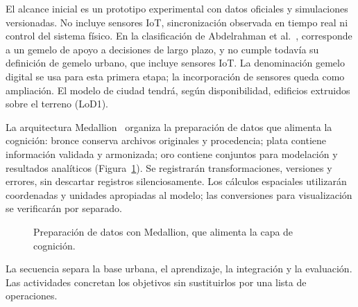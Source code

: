 \documentclass[journal]{IEEEtran}
\begin{document}
El alcance inicial es un prototipo experimental con datos oficiales y simulaciones versionadas. No incluye sensores IoT, sincronización observada en tiempo real ni control del sistema físico. En la clasificación de Abdelrahman et al.~\cite{abdelrahman2025}, corresponde a un gemelo de apoyo a decisiones de largo plazo, y no cumple todavía su definición de gemelo urbano, que incluye sensores IoT. La denominación gemelo digital se usa para esta primera etapa; la incorporación de sensores queda como ampliación. El modelo de ciudad tendrá, según disponibilidad, edificios extruidos sobre el terreno (LoD1).

La arquitectura Medallion~\cite{strengholt2025} organiza la preparación de datos que alimenta la cognición: bronce conserva archivos originales y procedencia; plata contiene información validada y armonizada; oro contiene conjuntos para modelación y resultados analíticos (Figura~\ref{fig:medallion}). Se registrarán transformaciones, versiones y errores, sin descartar registros silenciosamente. Los cálculos espaciales utilizarán coordenadas y unidades apropiadas al modelo; las conversiones para visualización se verificarán por separado.

\begin{figure}[!t]
\centering
{}
\caption{Preparación de datos con Medallion, que alimenta la capa de cognición.}
\label{fig:medallion}
\end{figure}

La secuencia separa la base urbana, el aprendizaje, la integración y la evaluación. Las actividades concretan los objetivos sin sustituirlos por una lista de operaciones.
\end{document}
